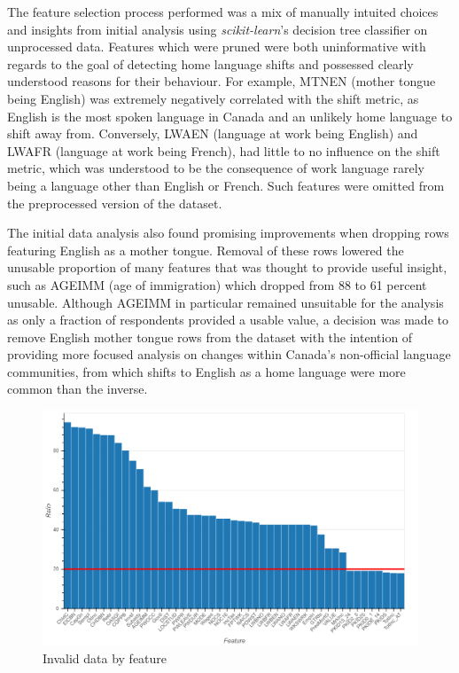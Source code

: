 \documentclass[10pt, conference, compsocconf]{IEEEtran}
\begin{document}
The feature selection process performed was a mix of manually intuited choices and insights from initial analysis using \textit{scikit-learn}'s decision tree classifier on unprocessed data.  Features which were pruned were both uninformative with regards to the goal of detecting home language shifts and possessed clearly understood reasons for their behaviour.  For example, MTNEN (mother tongue being English) was extremely negatively correlated with the shift metric, as English is the most spoken language in Canada and an unlikely home language to shift away from.  Conversely, LWAEN (language at work being English) and LWAFR (language at work being French), had little to no influence on the shift metric, which was understood to be the consequence of work language rarely being a language other than English or French.  Such features were omitted from the preprocessed version of the dataset.

The initial data analysis also found promising improvements when dropping rows featuring English as a mother tongue.  Removal of these rows lowered the unusable proportion of many features that was thought to provide useful insight, such as AGEIMM (age of immigration) which dropped from 88 to 61 percent unusable.  Although AGEIMM in particular remained unsuitable for the analysis as only a fraction of respondents provided a usable value, a decision was made to remove English mother tongue rows from the dataset with the intention of providing more focused analysis on changes within Canada's non-official language communities, from which shifts to English as a home language were more common than the inverse.

\begin{figure}
  \includegraphics[scale=0.25]{invalid_data_by_feature}
  \centering
  \caption{Invalid data by feature}
  \label{fig:invalid_data}
\end{figure}
\end{document}
